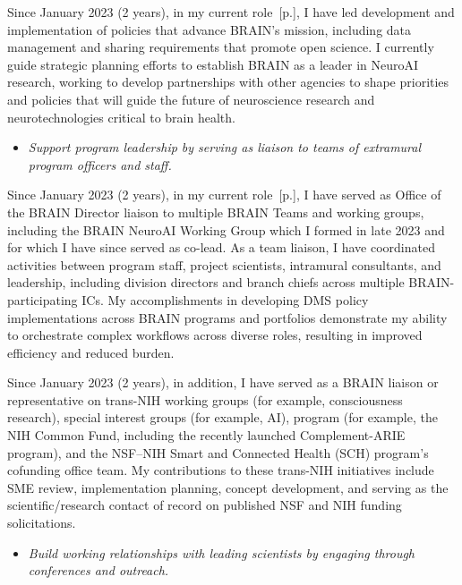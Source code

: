 \documentclass[10pt]{article}
\newcommand{\see}[1]{[\textcolor{hopkinsblue}{p.\pageref{sec:#1}}]}
\begin{document}
Since January 2023 (2 years), in my current role~\see{jobobd}, I have led
development and implementation of policies that advance BRAIN's mission,
including data management and sharing requirements that promote open science.
I currently guide strategic planning efforts to establish BRAIN as a leader in
NeuroAI research, working to develop partnerships with other agencies to shape
priorities and policies that will guide the future of neuroscience research and
neurotechnologies critical to brain health.

\begin{itemize}
  \color{hopkinsblue}
  \item \emph{Support program leadership by serving as liaison to teams of
extramural program officers and staff.}
\end{itemize}

Since January 2023 (2 years), in my current role~\see{jobobd}, I have served
as Office of the BRAIN Director liaison to multiple BRAIN Teams and working
groups, including the BRAIN NeuroAI Working Group which I formed in late
2023 and for which I have since served as co-lead. As a team liaison, I have
coordinated activities between program staff, project scientists, intramural
consultants, and leadership, including division directors and branch chiefs
across multiple BRAIN-participating ICs. My accomplishments in developing
DMS policy implementations across BRAIN programs and portfolios demonstrate
my ability to orchestrate complex workflows across diverse roles, resulting
in improved efficiency and reduced burden. 

Since January 2023 (2 years), in addition, I have served as a BRAIN liaison
or representative on trans-NIH working groups (for example, consciousness
research), special interest groups (for example, AI), program (for example,
the NIH Common Fund, including the recently launched Complement-ARIE program),
and the NSF--NIH Smart and Connected Health (SCH) program's cofunding
office team. My contributions to these trans-NIH initiatives include SME
review, implementation planning, concept development, and serving as the
scientific/research contact of record on published NSF and NIH funding
solicitations.

\begin{itemize}
  \color{hopkinsblue}
  \item \emph{Build working relationships with leading scientists by engaging
through conferences and outreach.}
\end{itemize}
\end{document}
